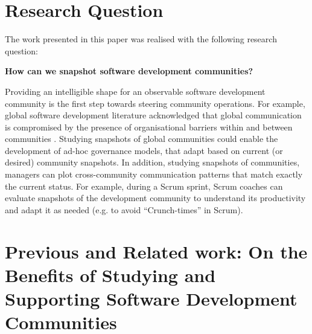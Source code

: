 \documentclass[conference]{IEEEtran}
\begin{document}

\section{Research Question}\label{rq}

The work presented in this paper was realised with the following research question:

\begin{center}
{\bf How can we snapshot software development communities?}
\end{center}

Providing an intelligible shape for an observable software development community is the first step towards steering community operations. For example, global software development literature acknowledged that global communication is compromised by the presence of organisational barriers within and between communities \cite{gse,gsdbook}. Studying snapshots of global communities could enable the development of ad-hoc governance models, that adapt based on current (or desired) community snapshots. In addition, studying snapshots of communities, managers can plot cross-community communication patterns that match exactly the current status. For example, during a Scrum sprint, Scrum coaches can evaluate snapshots of the development community to understand its productivity and adapt it as needed (e.g. to avoid ``Crunch-times'' in Scrum).


\section{Previous and Related work: On the Benefits of Studying and Supporting Software Development Communities}\label{devcomm}
\end{document}
